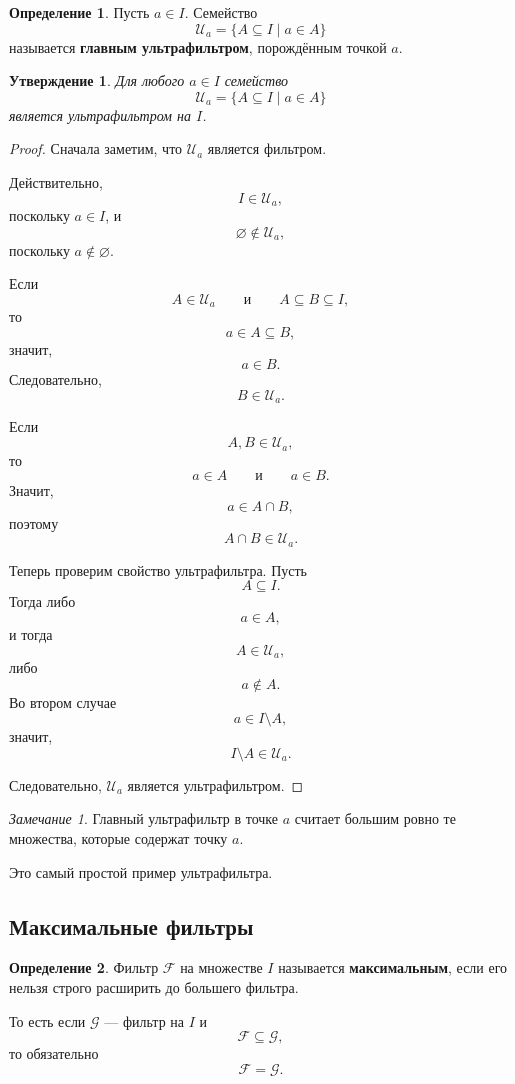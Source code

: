 \documentclass[12pt,a4paper,oneside,openany]{book}
\theoremstyle{definition}
\newtheorem{definition}{Определение}[chapter]
\theoremstyle{plain}
\newtheorem{proposition}{Утверждение}[chapter]
\theoremstyle{remark}
\newtheorem{remark}{Замечание}[chapter]
\begin{document}
\begin{definition}
Пусть $a\in I$. Семейство
\[
\mathcal U_a
=
\{A\subseteq I\mid a\in A\}
\]
называется \textbf{главным ультрафильтром}, порождённым точкой $a$.
\end{definition}

\begin{proposition}
Для любого $a\in I$ семейство
\[
\mathcal U_a
=
\{A\subseteq I\mid a\in A\}
\]
является ультрафильтром на $I$.
\end{proposition}

\begin{proof}
Сначала заметим, что $\mathcal U_a$ является фильтром.

Действительно,
\[
I\in\mathcal U_a,
\]
поскольку $a\in I$, и
\[
\varnothing\notin\mathcal U_a,
\]
поскольку $a\notin\varnothing$.

Если
\[
A\in\mathcal U_a
\qquad
\text{и}
\qquad
A\subseteq B\subseteq I,
\]
то
\[
a\in A\subseteq B,
\]
значит,
\[
a\in B.
\]
Следовательно,
\[
B\in\mathcal U_a.
\]

Если
\[
A,B\in\mathcal U_a,
\]
то
\[
a\in A
\qquad
\text{и}
\qquad
a\in B.
\]
Значит,
\[
a\in A\cap B,
\]
поэтому
\[
A\cap B\in\mathcal U_a.
\]

Теперь проверим свойство ультрафильтра. Пусть
\[
A\subseteq I.
\]
Тогда либо
\[
a\in A,
\]
и тогда
\[
A\in\mathcal U_a,
\]
либо
\[
a\notin A.
\]
Во втором случае
\[
a\in I\setminus A,
\]
значит,
\[
I\setminus A\in\mathcal U_a.
\]

Следовательно, $\mathcal U_a$ является ультрафильтром.
\end{proof}

\begin{remark}
Главный ультрафильтр в точке $a$ считает большим ровно те множества, которые содержат точку $a$.

Это самый простой пример ультрафильтра.
\end{remark}

\subsection{Максимальные фильтры}

\begin{definition}
Фильтр $\mathcal F$ на множестве $I$ называется \textbf{максимальным}, если его нельзя строго расширить до большего фильтра.

То есть если $\mathcal G$ — фильтр на $I$ и
\[
\mathcal F\subseteq\mathcal G,
\]
то обязательно
\[
\mathcal F=\mathcal G.
\]
\end{definition}
\end{document}
